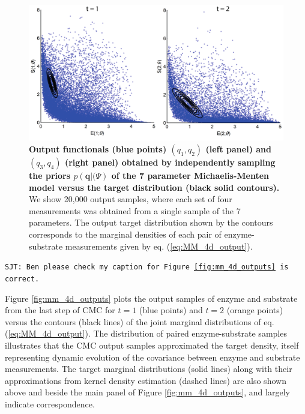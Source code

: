 \begin{figure}[H]
\centerline{\includegraphics[width=\textwidth]{../figures/mm_4d_main.pdf}}
\caption{\textbf{Output functionals (blue points) $(q_1,q_2)$ (left panel) and $(q_3,q_4)$ (right panel) obtained by independently sampling the priors $p(\boldsymbol{q} | \boldsymbol(\Psi)$ of the 7 parameter Michaelis-Menten model versus the target distribution (black solid contours).} We show 20,000 output samples, where each set of four measurements was obtained from a single sample of the 7 parameters. The output target distribution shown by the contours corresponds to the marginal densities of each pair of enzyme-substrate measurements given by eq. (\ref{eq:MM_4d_output}).}
\label{fig:mm_4d_main}
\end{figure}
{\tt SJT: Ben please check my caption for Figure \ref{fig:mm_4d_outputs} is correct.}

Figure \ref{fig:mm_4d_outputs} plots the output samples of enzyme and substrate from the last step of CMC for $t=1$ (blue points) and $t=2$ (orange points) versus the contours (black lines) of the joint marginal distributions of eq. (\ref{eq:MM_4d_output}). The distribution of paired enzyme-substrate samples illustrates that the CMC output samples approximated the target density, itself representing dynamic evolution of the covariance between enzyme and substrate measurements. The target marginal distributions (solid lines) along with their approximations from kernel density estimation (dashed lines) are also shown above and beside the main panel of Figure \ref{fig:mm_4d_outputs}, and largely indicate correspondence.

